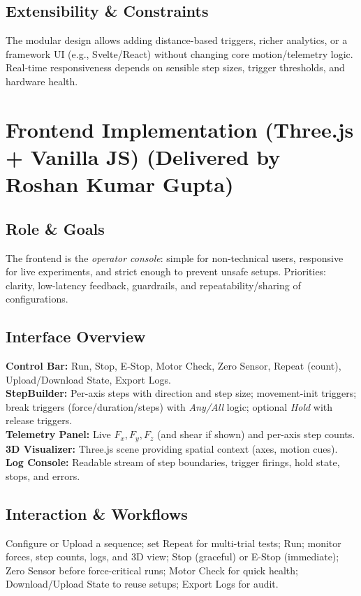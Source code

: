 \documentclass[
    twocolumn,
    fontsize = 10pt,
    parskip = half+,
    headings = small,
    headwidth = text,
    footwidth = text,
]{scrartcl}
\begin{document}
\subsection{Extensibility \& Constraints}
The modular design allows adding distance-based triggers, richer analytics, or a framework UI (e.g., Svelte/React) without changing core motion/telemetry logic. Real-time responsiveness depends on sensible step sizes, trigger thresholds, and hardware health.


\section{Frontend Implementation (Three.js + Vanilla JS) \textnormal{(Delivered by Roshan Kumar Gupta)}}
\label{sec:frontend}

\subsection{Role \& Goals}
The frontend is the \emph{operator console}: simple for non-technical users, responsive for live experiments, and strict enough to prevent unsafe setups. Priorities: clarity, low-latency feedback, guardrails, and repeatability/sharing of configurations.

\subsection{Interface Overview}
\textbf{Control Bar:} Run, Stop, E-Stop, Motor Check, Zero Sensor, Repeat (count), Upload/Download State, Export Logs.\\
\textbf{StepBuilder:} Per-axis steps with direction and step size; movement-init triggers; break triggers (force/duration/steps) with \emph{Any/All} logic; optional \emph{Hold} with release triggers.\\
\textbf{Telemetry Panel:} Live $F_x, F_y, F_z$ (and shear if shown) and per-axis step counts.\\
\textbf{3D Visualizer:} Three.js scene providing spatial context (axes, motion cues).\\
\textbf{Log Console:} Readable stream of step boundaries, trigger firings, hold state, stops, and errors.

\subsection{Interaction \& Workflows}
Configure or Upload a sequence; set Repeat for multi-trial tests; Run; monitor forces, step counts, logs, and 3D view; Stop (graceful) or E-Stop (immediate); Zero Sensor before force-critical runs; Motor Check for quick health; Download/Upload State to reuse setups; Export Logs for audit.
\end{document}
